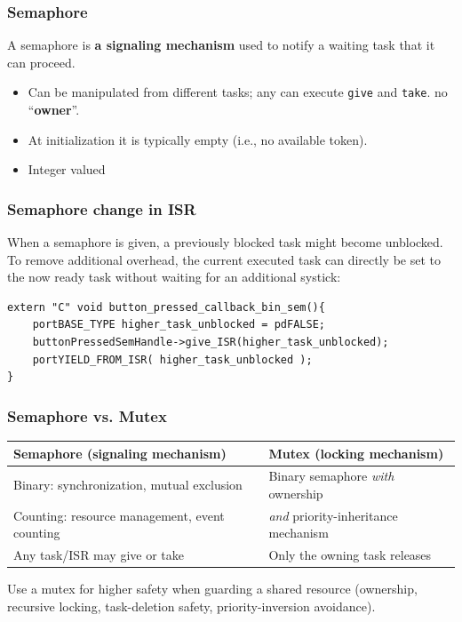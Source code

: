     \subsubsection{Semaphore}
    A semaphore is \textbf{a signaling mechanism} used to notify a waiting task that it can proceed.
    \begin{itemize}
        \item Can be manipulated from different tasks; any can execute \texttt{give} and \texttt{take}. \textrightarrow{} no ``\textbf{owner}''.
        \item At initialization it is typically empty (i.e., no available token).
        \item Integer valued
    \end{itemize}
    
    \subsubsection{Semaphore change in ISR}
    \label{Mutex_From_ISR}
    When a semaphore is given, a previously blocked task might become unblocked.
    To remove additional overhead, the current executed task can directly be set to the now ready task without waiting for an additional systick:
\begin{lstlisting}
extern "C" void button_pressed_callback_bin_sem(){
    portBASE_TYPE higher_task_unblocked = pdFALSE;
    buttonPressedSemHandle->give_ISR(higher_task_unblocked);
    portYIELD_FROM_ISR( higher_task_unblocked );
} \end{lstlisting}

\subsubsection{Semaphore vs. Mutex}
\begin{tabular}{p{} p{}}
\hline
\textbf{Semaphore (signaling mechanism)} & \textbf{Mutex (locking mechanism)} \\
\hline
Binary: synchronization, mutual exclusion & Binary semaphore \emph{with} ownership \\
Counting: resource management, event counting & \emph{and} priority-inheritance mechanism \\
Any task/ISR may give or take & Only the owning task releases \\
\hline
\end{tabular}
Use a mutex for higher safety when guarding a shared resource (ownership, recursive locking, task-deletion safety, priority-inversion avoidance).

